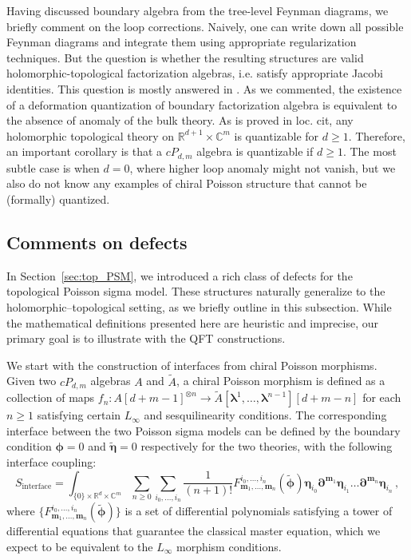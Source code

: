 \documentclass[11pt]{article}
\newcommand{\C}{\mathbb{C}}
\newcommand{\R}{\mathbb{R}}
\numberwithin{equation}{section}
\begin{document}
Having discussed boundary algebra from the tree-level Feynman diagrams, we briefly comment on the loop corrections. Naively, one can write down all possible Feynman diagrams and integrate them using appropriate regularization techniques. But the question is whether the resulting structures are valid holomorphic-topological factorization algebras, i.e. satisfy appropriate Jacobi identities.  This question is mostly answered in \cite{Gaiotto:2024gii,balduf2025combinatorial,wang2024factorization}. As we commented, the existence of a deformation quantization of boundary factorization algebra is equivalent to the absence of anomaly of the bulk theory. As is proved in loc. cit, any holomorphic topological theory on $\R^{d+1}\times\C^m$ is quantizable for $d \geq 1$. Therefore, an important corollary is that a $cP_{d,m}$ algebra is quantizable if $d\geq 1$. The most subtle case is when $d = 0$, where higher loop anomaly might not vanish, but we also do not know any examples of chiral Poisson structure that cannot be (formally) quantized. 



\subsection{Comments on defects}
In Section~\ref{sec:top_PSM}, we introduced a rich class of defects for the topological Poisson sigma model. These structures naturally generalize to the holomorphic--topological setting, as we briefly outline in this subsection. While the mathematical definitions presented here are heuristic and imprecise, our primary goal is to illustrate with the QFT constructions.

We start with the construction of interfaces from chiral Poisson morphisms. Given two $cP_{d,m}$ algebras $A$ and $\tilde{A}$, a chiral Poisson morphism is defined as a collection of maps $f_n: A[d+m-1]^{\otimes n} \to \tilde{A}[\boldsymbol{\lambda}^1,\dots,\boldsymbol{\lambda}^{n-1}][d+m-n]$ for each $n\geq 1$ satisfying certain $L_\infty$ and sesquilinearity conditions. The corresponding interface between the two Poisson sigma models can be defined by the boundary condition $\boldsymbol{\phi }= 0$ and $\widetilde{\boldsymbol{\eta}} = 0$ respectively for the two theories, with the following interface coupling:
\begin{equation}
	S_{\mathrm{interface}} = \int_{\{0\}\times \R^{d}\times \C^m} \sum_{n\geq 0}\sum_{i_0,\dots,i_n}\frac{1}{(n+1)!}F^{i_0,\dots,i_n}_{\boldsymbol{m}_1,\dots,\boldsymbol{m}_n}(\widetilde{\boldsymbol{\phi}})\boldsymbol{\eta}_{i_0} \boldsymbol{\partial}^{\boldsymbol{m}_1}\boldsymbol{\eta}_{i_1} \dots \boldsymbol{\partial}^{\boldsymbol{m}_n}\boldsymbol{\eta}_{i_n} \,,	
\end{equation}
where $\{F^{i_0,\dots,i_n}_{\boldsymbol{m}_1,\dots,\boldsymbol{m}_n}(\widetilde{\boldsymbol{\phi}})\}$ is a set of differential polynomials satisfying a tower of differential equations that guarantee the classical master equation, which we expect to be equivalent to the $L_\infty$ morphism conditions.
\end{document}
